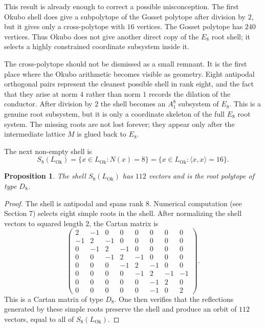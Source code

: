 \documentclass{birkjour}
\newtheorem{proposition}[theorem]{Proposition}
\newcommand{\LOk}{L_{\mathrm{Ok}}}
\numberwithin{equation}{section}
\begin{document}
This result is already enough to correct a possible misconception. The first
Okubo shell does give a subpolytope of the Gosset polytope after division by
\(2\), but it gives only a cross-polytope with \(16\) vertices. The Gosset
polytope has \(240\) vertices. Thus Okubo does not give another direct copy of
the \(E_8\) root shell; it selects a highly constrained coordinate subsystem
inside it.

The cross-polytope should not be dismissed as a small remnant. It is the first
place where the Okubo arithmetic becomes visible as geometry. Eight antipodal
orthogonal pairs represent the cleanest possible shell in rank eight, and the
fact that they arise at norm \(4\) rather than norm \(1\) records the dilation
of the conductor. After division by \(2\) the shell becomes an \(A_1^8\)
subsystem of \(E_8\). This is a genuine root subsystem, but it is only a
coordinate skeleton of the full \(E_8\) root system. The missing roots are not
lost forever; they appear only after the intermediate lattice \(M\) is glued
back to \(E_8\).

The next non-empty shell is
\begin{equation}
S_8(\LOk)=\{x\in\LOk:N(x)=8\}
=\{x\in\LOk:\langle x,x\rangle=16\}.
\end{equation}

\begin{proposition}
\label{prop:D8-root}
The shell \(S_8(\LOk)\) has \(112\) vectors and is the root polytope of type
\(D_8\).
\end{proposition}

\begin{proof}
The shell is antipodal and spans rank \(8\). Numerical computation (see Section 7)
selects eight simple roots in the shell. After normalizing the shell vectors
to squared length \(2\), the Cartan matrix is
\begin{equation}
\begin{pmatrix}
2&-1&0&0&0&0&0&0\\
-1&2&-1&0&0&0&0&0\\
0&-1&2&-1&0&0&0&0\\
0&0&-1&2&-1&0&0&0\\
0&0&0&-1&2&-1&0&0\\
0&0&0&0&-1&2&-1&-1\\
0&0&0&0&0&-1&2&0\\
0&0&0&0&0&-1&0&2
\end{pmatrix}.
\end{equation}
This is a Cartan matrix of type \(D_8\). One then verifies
that the reflections generated by these simple roots preserve the shell and
produce an orbit of \(112\) vectors, equal to all of \(S_8(\LOk)\).
\end{proof}
\end{document}

